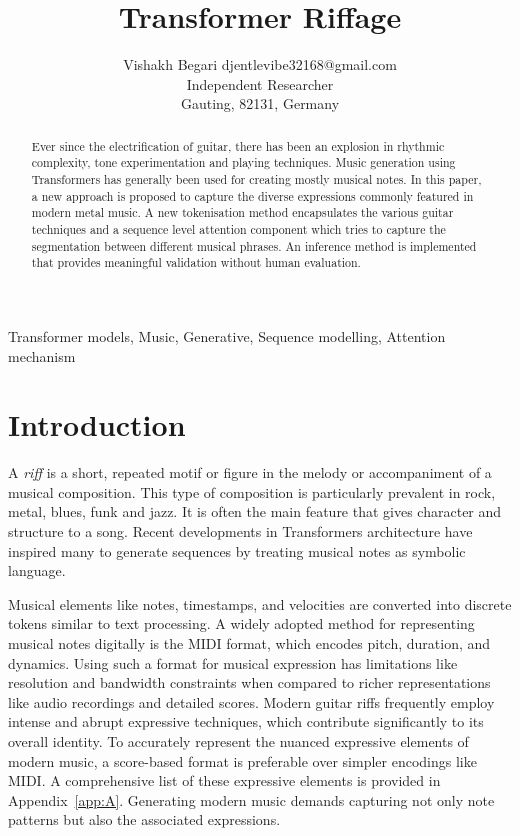 \documentclass[twoside,11pt]{article}
\begin{document}
\title{Transformer Riffage}

\author{\name Vishakh Begari \email djentlevibe32168@gmail.com \\
       \addr Independent Researcher\\
       Gauting, 82131, Germany}


\maketitle

\begin{abstract}%
Ever since the electrification of guitar, there has been an explosion 
in rhythmic complexity, tone experimentation and playing techniques. Music 
generation using Transformers \cite{Vaswani2} has generally 
been used for creating mostly musical notes. In this paper, a new approach is proposed 
to capture the diverse expressions commonly featured in modern metal music. 
A new tokenisation method encapsulates the various guitar techniques and a sequence level attention component 
which tries to capture the segmentation between different musical phrases.
An inference method is implemented that provides meaningful validation without human evaluation.
\end{abstract}

\begin{keywords}
  Transformer models, Music, Generative, Sequence modelling, Attention mechanism
\end{keywords}

\section{Introduction}
A \textit{riff} is a short, repeated motif or figure in the melody or accompaniment of a 
musical composition. \cite{randel:86} This type of composition is particularly prevalent 
in rock, metal, blues, funk and jazz. It is often the main feature that gives character 
and structure to a song. Recent developments in Transformers architecture have inspired 
many to generate sequences by treating musical notes as symbolic language. 

Musical elements like notes, timestamps, and velocities are converted into discrete tokens similar to 
text processing. \cite{aws_deepcomposer} A widely adopted method for representing musical notes digitally is the MIDI format, 
which encodes pitch, duration, and dynamics. Using such a format for musical expression has limitations like resolution 
and bandwidth constraints \cite{midi_short} when compared to richer representations like 
audio recordings and detailed scores. Modern guitar riffs frequently employ intense and abrupt expressive
techniques, which contribute significantly to its overall identity. To accurately represent the nuanced 
expressive elements of modern music, a score-based format is preferable over simpler encodings like MIDI.
A comprehensive list of these expressive elements is provided in Appendix~\ref{app:A}. Generating modern music 
demands capturing not only note patterns but also the associated expressions. 
\end{document}
